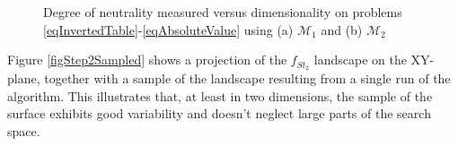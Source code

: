 \documentclass[conference]{IEEEtran}
\begin{document}
\begin{figure}[!t]
	\centering
	\label{figNeutralityVsDimensionsM1}	
		
	\label{figNeutralityVsDimensionsM2}	
	\caption{Degree of neutrality measured versus dimensionality on problems \ref{eqInvertedTable}-\ref{eqAbsoluteValue} using (a) ${\mathcal{M}_1}$ and (b) ${\mathcal{M}_2}$ }
	\label{figNeutralityVsDimensions}
\end{figure}

Figure \ref{figStep2Sampled} shows a projection of the $f_{\textit{St}_2}$ landscape on the XY-plane, together with a sample of the landscape resulting from a single run of the algorithm. This illustrates that, at least in two dimensions, the sample of the surface exhibits good variability and doesn't neglect large parts of the search space.
\end{document}
